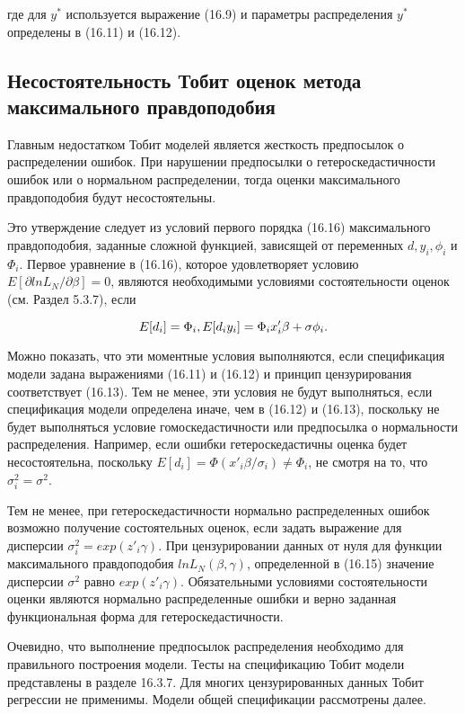 где для $y^{*}$ используется выражение (16.9) и параметры распределения $y^{*}$ определены в (16.11) и (16.12).

\subsection{Несостоятельность Тобит оценок метода максимального правдоподобия}

Главным недостатком Тобит моделей является жесткость предпосылок о распределении ошибок. При нарушении предпосылки о гетероскедастичности ошибок или о нормальном распределении, тогда оценки максимального правдоподобия будут несостоятельны.

Это утверждение следует из условий первого порядка (16.16) максимального правдоподобия, заданные сложной функцией, зависящей от переменных $d, y_i, \phi_i$ и $\Phi_i$. Первое уравнение в (16.16), которое удовлетворяет условию $E[\partial{lnL_N}/\partial\beta]=0$, являются необходимыми условиями состоятельности оценок (см. Раздел 5.3.7), если

\[
E[d_i]=\Phi_i, \\
E[d_{i}y_{i}]=\Phi_{i}x'_{i}\beta+\sigma\phi_i.
\]

Можно показать, что эти моментные условия выполняются, если спецификация модели задана выражениями (16.11) и (16.12) и принцип цензурирования соответствует (16.13). Тем не менее, эти условия не будут выполняться, если спецификация модели определена иначе, чем в (16.12) и (16.13), поскольку не будет выполняться условие гомоскедастичности или предпосылка о нормальности распределения. Например, если ошибки гетероскедастичны оценка будет несостоятельна, поскольку $E[d_i]=\Phi(x'_{i}\beta/\sigma_{i}){\neq}\Phi_{i}$, не смотря на то, что $\sigma^2_i=\sigma^{2}$.

Тем не менее, при гетероскедастичности нормально распределенных ошибок возможно получение состоятельных оценок, если задать выражение для дисперсии $\sigma^2_i=exp(z'_i\gamma)$. При цензурировании данных от нуля для функции максимального правдоподобия $lnL_{N}(\beta,\gamma)$, определенной в (16.15) значение дисперсии $\sigma^2$ равно $exp(z'_i\gamma)$. Обязательными условиями состоятельности оценки являются нормально распределенные ошибки и верно заданная функциональная форма для гетероскедастичности.


Очевидно, что выполнение предпосылок распределения необходимо для правильного построения модели. Тесты на спецификацию Тобит модели представлены в разделе 16.3.7. Для многих цензурированных данных Тобит регрессии не применимы. Модели общей спецификации рассмотрены далее.



